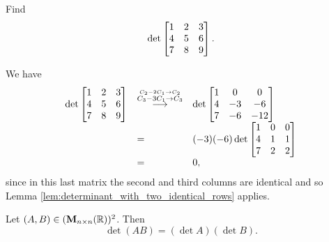 \begin{exa}
Find $$\det\begin{bmatrix} 1 & 2 & 3 \cr 4 & 5 & 6 \cr  7 & 8 & 9
\cr
\end{bmatrix}.$$
\end{exa}
\begin{solu}We have $$\begin{array}{lll}\det\begin{bmatrix} 1 & 2 &
3 \cr 4 & 5 & 6 \cr  7 & 8 & 9 \cr
\end{bmatrix} & \mathrel{ \mathop{\longrightarrow}\limits^{\stackrel{C_2 - 2C_1 \rightarrow C_2}{C_3 - 3C_1 \rightarrow C_3}\mathstrut}_{ \begin{subarray}{l} \relax \end{subarray}}}
& \det\begin{bmatrix} 1 & 0 & 0 \cr 4 & -3 & -6 \cr  7 & -6 &
-12\cr
\end{bmatrix} \\
& = & (-3)(-6)\det\begin{bmatrix} 1 & 0 & 0 \cr 4 & 1 & 1 \cr  7 &
2 & 2\cr
\end{bmatrix} \\
& = & 0,
\end{array}$$
since in this last matrix the second and third columns are
identical and so Lemma
\ref{lem:determinant_with_two_identical_rows} applies.
\end{solu}
\begin{thm}
Let $(A, B)\in ({\mathbf M}_{n\times n}( \mathbb{R}))^2$. Then $$\det (AB) =
(\det A)(\det B).
$$
\label{thm:product_of_determinants}\end{thm}
